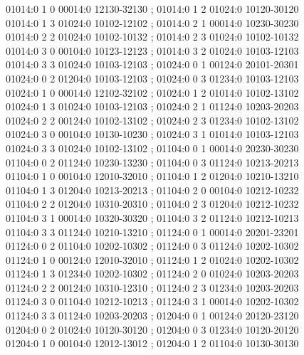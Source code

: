 \documentclass[11pt]{article}
\theoremstyle{remark}
\numberwithin{equation}{section}
\begin{document}
\begin{flushleft}
01014:0 1 0 00014:0 12130-32130 ; 01014:0 1 2 01024:0 10120-30120\\
01014:0 1 3 01024:0 10102-12102 ; 01014:0 2 1 00014:0 10230-30230\\
01014:0 2 2 01024:0 10102-10132 ; 01014:0 2 3 01024:0 10102-10132\\
01014:0 3 0 00104:0 10123-12123 ; 01014:0 3 2 01024:0 10103-12103\\
01014:0 3 3 01024:0 10103-12103 ; 01024:0 0 1 00124:0 20101-20301\\
01024:0 0 2 01204:0 10103-12103 ; 01024:0 0 3 01234:0 10103-12103\\
01024:0 1 0 00014:0 12102-32102 ; 01024:0 1 2 01014:0 10102-13102\\
01024:0 1 3 01024:0 10103-12103 ; 01024:0 2 1 01124:0 10203-20203\\
01024:0 2 2 00124:0 10102-13102 ; 01024:0 2 3 01234:0 10102-13102\\
01024:0 3 0 00104:0 10130-10230 ; 01024:0 3 1 01014:0 10103-12103\\
01024:0 3 3 01024:0 10102-13102 ; 01104:0 0 1 00014:0 20230-30230\\
01104:0 0 2 01124:0 10230-13230 ; 01104:0 0 3 01124:0 10213-20213\\
01104:0 1 0 00104:0 12010-32010 ; 01104:0 1 2 01204:0 10210-13210\\
01104:0 1 3 01204:0 10213-20213 ; 01104:0 2 0 00104:0 10212-10232\\
01104:0 2 2 01204:0 10310-20310 ; 01104:0 2 3 01204:0 10212-10232\\
01104:0 3 1 00014:0 10320-30320 ; 01104:0 3 2 01124:0 10212-10213\\
01104:0 3 3 01124:0 10210-13210 ; 01124:0 0 1 00014:0 20201-23201\\
01124:0 0 2 01104:0 10202-10302 ; 01124:0 0 3 01124:0 10202-10302\\
01124:0 1 0 00124:0 12010-32010 ; 01124:0 1 2 01024:0 10202-10302\\
01124:0 1 3 01234:0 10202-10302 ; 01124:0 2 0 01024:0 10203-20203\\
01124:0 2 2 00124:0 10310-12310 ; 01124:0 2 3 01234:0 10203-20203\\
01124:0 3 0 01104:0 10212-10213 ; 01124:0 3 1 00014:0 10202-10302\\
01124:0 3 3 01124:0 10203-20203 ; 01204:0 0 1 00124:0 20120-23120\\
01204:0 0 2 01024:0 10120-30120 ; 01204:0 0 3 01234:0 10120-20120\\
01204:0 1 0 00104:0 12012-13012 ; 01204:0 1 2 01104:0 10130-30130\\

\end{flushleft}
\end{document}
